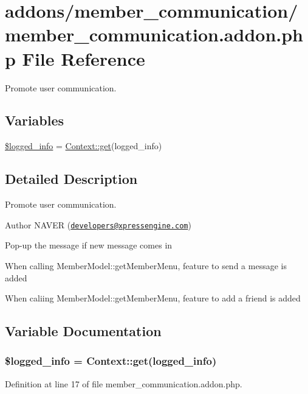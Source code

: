 \hypertarget{member__communication_8addon_8php}{}\section{addons/member\+\_\+communication/member\+\_\+communication.addon.\+php File Reference}
\label{member__communication_8addon_8php}


Promote user communication.  


\subsection*{Variables}
\begin{DoxyCompactItemize}
\item 
\hyperlink{member__communication_8addon_8php_a193c1593ceb216e9fb05b0bad01ebbc8}{\$logged\+\_\+info} = \hyperlink{classContext_a90ce25d65fe6c9778421cbb36ab3def5}{Context\+::get}(\textquotesingle{}logged\+\_\+info\textquotesingle{})
\end{DoxyCompactItemize}


\subsection{Detailed Description}
Promote user communication. 

\begin{DoxyAuthor}{Author}
N\+A\+V\+E\+R (\href{mailto:developers@xpressengine.com}{\tt developers@xpressengine.\+com})
\begin{DoxyItemize}
\item Pop-\/up the message if new message comes in
\item When calling Member\+Model\+::get\+Member\+Menu, feature to send a message is added
\item When caliing Member\+Model\+::get\+Member\+Menu, feature to add a friend is added 
\end{DoxyItemize}
\end{DoxyAuthor}


\subsection{Variable Documentation}
\hypertarget{member__communication_8addon_8php_a193c1593ceb216e9fb05b0bad01ebbc8}{}
\subsubsection[{\$logged\+\_\+info}]{\setlength{\rightskip}{0pt plus 5cm}\$logged\+\_\+info = {\bf Context\+::get}(\textquotesingle{}logged\+\_\+info\textquotesingle{})}\label{member__communication_8addon_8php_a193c1593ceb216e9fb05b0bad01ebbc8}


Definition at line 17 of file member\+\_\+communication.\+addon.\+php.

